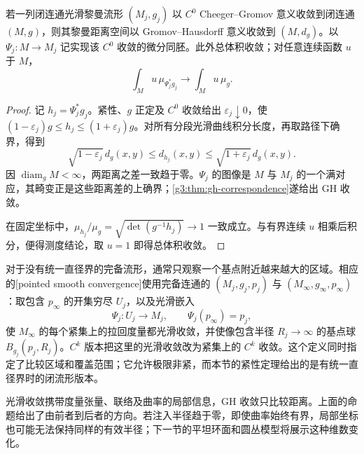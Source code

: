 \begin{proposition}\label{g3:prop:smooth-convergence-implies-gh}
	若一列闭连通光滑黎曼流形 \((M_j,g_j)\) 以 \(C^0\) Cheeger--Gromov 意义收敛到闭连通 \((M,g)\)，则其黎曼距离空间以 Gromov--Hausdorff 意义收敛到 \((M,d_g)\)。以 \(\Psi_j:M\to M_j\) 记实现该 \(C^0\) 收敛的微分同胚。此外总体积收敛；对任意连续函数 \(u\) 于 \(M\)，
	\[
		\int_Mu\,\mu_{\Psi_j^*g_j}\longrightarrow\int_Mu\,\mu_g.
	\]
\end{proposition}
\begin{proof}
	记 \(h_j=\Psi_j^*g_j\)。紧性、\(g\) 正定及 \(C^0\) 收敛给出 \(\varepsilon_j\downarrow0\)，使
	\((1-\varepsilon_j)g\le h_j\le(1+\varepsilon_j)g\)。对所有分段光滑曲线积分长度，再取路径下确界，得到
	\[
		\sqrt{1-\varepsilon_j}\,d_g(x,y)
		\le d_{h_j}(x,y)
		\le\sqrt{1+\varepsilon_j}\,d_g(x,y).
	\]
	因 \(\operatorname{diam}_gM<\infty\)，两距离之差一致趋于零。\(\Psi_j\) 的图像是 \(M\) 与 \(M_j\) 的一个满对应，其畸变正是这些距离差的上确界；\cref{g3:thm:gh-correspondence}遂给出 GH 收敛。

	在固定坐标中，\(\mu_{h_j}/\mu_g=\sqrt{\det(g^{-1}h_j)}\to1\) 一致成立。与有界连续 \(u\) 相乘后积分，便得测度结论，取 \(u=1\) 即得总体积收敛。
\end{proof}

对于没有统一直径界的完备流形，通常只观察一个基点附近越来越大的区域。相应的[pointed smooth convergence]使用完备连通的 \((M_j,g_j,p_j)\) 与 \((M_\infty,g_\infty,p_\infty)\)：取包含 \(p_\infty\) 的开集穷尽 \(U_j\)，以及光滑嵌入
\[
	\Psi_j:U_j\longrightarrow M_j,\qquad
	\Psi_j(p_\infty)=p_j,
\]
使 \(M_\infty\) 的每个紧集上的拉回度量都光滑收敛，并使像包含半径 \(R_j\to\infty\) 的基点球 \(B_{g_j}(p_j,R_j)\)。\(C^k\) 版本把这里的光滑收敛改为紧集上的 \(C^k\) 收敛。这个定义同时指定了比较区域和覆盖范围；它允许极限非紧，而本节的紧性定理给出的是有统一直径界时的闭流形版本。

\ProseParagraphBreak
光滑收敛携带度量张量、联络及曲率的局部信息，GH 收敛只比较距离。上面的命题给出了由前者到后者的方向。若注入半径趋于零，即使曲率始终有界，局部坐标也可能无法保持同样的有效半径；下一节的平坦环面和圆丛模型将展示这种维数变化。

